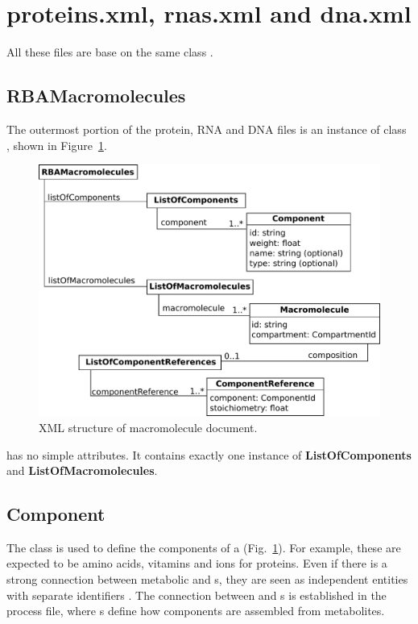 
\section{proteins.xml, rnas.xml and dna.xml}

All these files are base on the same class \rbamacromolecules.


\subsection{RBAMacromolecules}
\label{sec:rba_macromolecules}

The outermost portion of the protein, RNA and DNA files is an instance of class
\rbamacromolecules, shown in Figure~\ref{fig:macromolecules}.

\begin{figure}
  \centering
  \includegraphics[scale=0.8]{figures/macromolecules}
  \caption{XML structure of macromolecule document.}
\label{fig:macromolecules}
\end{figure}

\rbamacromolecules{} has no simple attributes.
It contains exactly one instance of \textbf{ListOfComponents}
and \textbf{ListOfMacromolecules}.


\subsection{Component}
\label{sec:component}

The \component{} class is used to define the components of a \macromolecule{}
(Fig.~\ref{fig:macromolecules}).
For example, these are expected to be amino acids, vitamins and ions for
proteins.
Even if there is a strong connection between metabolic \species and \component{}s,
they are seen as independent entities with separate identifiers \species.
The connection between \species and \component{}s is established in the process file,
where \processingmap{}s define how components are assembled from metabolites.


